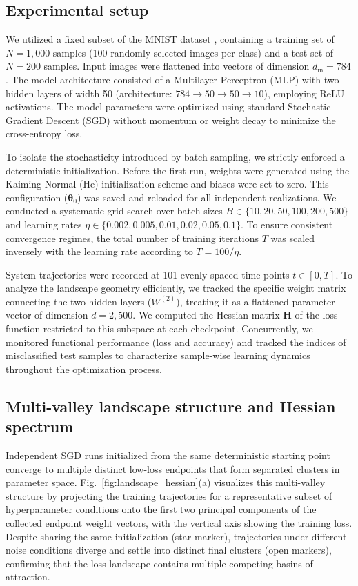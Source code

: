 \documentclass[aps,prx,preprint,superscriptaddress,nofootinbib]{revtex4-2}
\begin{document}
\subsection{Experimental setup}

We utilized a fixed subset of the MNIST dataset \cite{lecun1998gradient}, containing a training set of $N=1,000$ samples (100 randomly selected images per class) and a test set of $N=200$ samples. Input images were flattened into vectors of dimension $d_\mathrm{in}=784$. The model architecture consisted of a Multilayer Perceptron (MLP) with two hidden layers of width 50 (architecture: $784 \to 50 \to 50 \to 10$), employing ReLU activations. The model parameters were optimized using standard Stochastic Gradient Descent (SGD) without momentum or weight decay to minimize the cross-entropy loss.

To isolate the stochasticity introduced by batch sampling, we strictly enforced a deterministic initialization. Before the first run, weights were generated using the Kaiming Normal (He) initialization scheme and biases were set to zero. This configuration ($\bm{\theta}_0$) was saved and reloaded for all independent realizations. We conducted a systematic grid search over batch sizes $B \in \{10, 20, 50, 100, 200, 500\}$ and learning rates $\eta \in \{0.002, 0.005, 0.01, 0.02, 0.05, 0.1\}$. To ensure consistent convergence regimes, the total number of training iterations $T$ was scaled inversely with the learning rate according to $T = 100 / \eta$.

System trajectories were recorded at 101 evenly spaced time points $t \in [0, T]$. To analyze the landscape geometry efficiently, we tracked the specific weight matrix connecting the two hidden layers ($W^{(2)}$), treating it as a flattened parameter vector of dimension $d=2,500$. We computed the Hessian matrix $\mathbf{H}$ of the loss function restricted to this subspace at each checkpoint. Concurrently, we monitored functional performance (loss and accuracy) and tracked the indices of misclassified test samples to characterize sample-wise learning dynamics throughout the optimization process.

\subsection{Multi-valley landscape structure and Hessian spectrum}

Independent SGD runs initialized from the same deterministic starting point converge to multiple distinct low-loss endpoints that form separated clusters in parameter space. Fig.~\ref{fig:landscape_hessian}(a) visualizes this multi-valley structure by projecting the training trajectories for a representative subset of hyperparameter conditions onto the first two principal components of the collected endpoint weight vectors, with the vertical axis showing the training loss. Despite sharing the same initialization (star marker), trajectories under different noise conditions diverge and settle into distinct final clusters (open markers), confirming that the loss landscape contains multiple competing basins of attraction.
\end{document}
